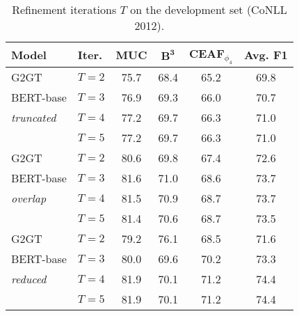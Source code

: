 \documentclass[11pt]{article}
\begin{document}
\begin{table}[t]
	\centering
	\begin{adjustbox}{width=1\linewidth}
		\begin{tabular}{l l c c c c } 
			\toprule 
			\textbf{Model} & \textbf{Iter.} & \textbf{MUC} & \textbf{$\mathbf{B^3}$} & \textbf{CEAF$_{\phi_4}$} & \textbf{Avg. F1}\\ \hline
			G2GT  & $T=2$ & 75.7 & 68.4 & 65.2 & 69.8 \\
			BERT-base & $T=3$ & 76.9 & 69.3 & 66.0 & 70.7 \\
			\emph{truncated}& $T=4$ & 77.2 & 69.7 & 66.3 & 71.0 \\
			& $T=5$ & 77.2 & 69.7 & 66.3 & 71.0 \\ \hline
			G2GT   & $T=2$ & 80.6 & 69.8 & 67.4 & 72.6 \\ 
			BERT-base & $T=3$ & 81.6	& 71.0 & 68.6 &  73.7 \\
			\emph{overlap}& $T=4$ & 81.5 & 70.9 & 68.7 & 73.7 \\
			& $T=5$ & 81.4 & 70.6 & 68.7 & 73.5 \\\hline
			G2GT   & $T=2$ & 79.2 & 76.1 & 68.5 & 71.6  \\
			BERT-base& $T=3$ & 80.0 & 69.6 & 70.2 & 73.3  \\
			\emph{reduced}& $T=4$ & 81.9 & 70.1 & 71.2 & 74.4 \\
			& $T=5$ & 81.9 & 70.1 & 71.2 & 74.4  \\
			\bottomrule 
		\end{tabular} 
	\end{adjustbox}  
	\caption{Refinement iterations $T$ on the development set (CoNLL 2012).}
	\label{tab:coreference:iter}
	
\end{table}
\end{document}
